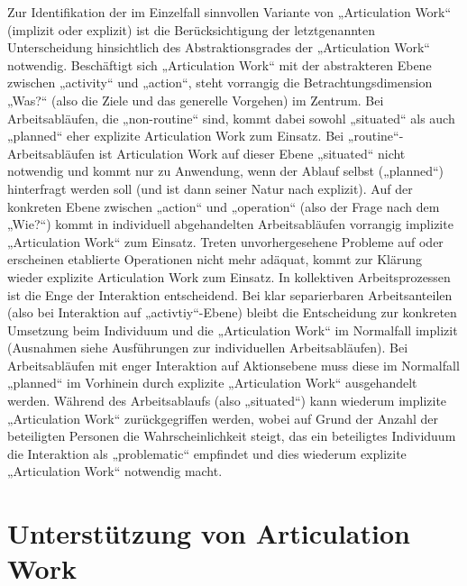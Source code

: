 Zur Identifikation der im Einzelfall sinnvollen Variante von „Articulation Work“ (implizit oder explizit) ist die Berücksichtigung der letztgenannten Unterscheidung hinsichtlich des Abstraktionsgrades der „Articulation Work“ notwendig. Beschäftigt sich „Articulation Work“ mit der abstrakteren Ebene zwischen „activity“ und „action“, steht vorrangig die Betrachtungsdimension „Was?“ (also die Ziele und das generelle Vorgehen) im Zentrum. Bei Arbeitsabläufen, die „non-routine“ sind, kommt dabei sowohl „situated“ als auch „planned“ eher explizite Articulation Work zum Einsatz. Bei „routine“-Arbeitsabläufen ist Articulation Work auf dieser Ebene „situated“ nicht notwendig und kommt nur zu Anwendung, wenn der Ablauf selbst („planned“) hinterfragt werden soll (und ist dann seiner Natur nach explizit). Auf der konkreten Ebene zwischen „action“ und „operation“ (also der Frage nach dem „Wie?“) kommt in individuell abgehandelten Arbeitsabläufen vorrangig implizite „Articulation Work“ zum Einsatz. Treten unvorhergesehene Probleme auf oder erscheinen etablierte Operationen nicht mehr adäquat, kommt zur Klärung wieder explizite Articulation Work zum Einsatz. In kollektiven Arbeitsprozessen ist die Enge der Interaktion entscheidend. Bei klar separierbaren Arbeitsanteilen (also bei Interaktion auf „activtiy“-Ebene) bleibt die Entscheidung zur konkreten Umsetzung beim Individuum und die „Articulation Work“ im Normalfall implizit (Ausnahmen siehe Ausführungen zur individuellen Arbeitsabläufen). Bei Arbeitsabläufen mit enger Interaktion auf Aktionsebene muss diese im Normalfall „planned“ im Vorhinein durch explizite „Articulation Work“ ausgehandelt werden. Während des Arbeitsablaufs (also „situated“) kann wiederum implizite „Articulation Work“ zurückgegriffen werden, wobei auf Grund der Anzahl der beteiligten Personen die Wahrscheinlichkeit steigt, das ein beteiligtes Individuum die Interaktion als „problematic“ empfindet und dies wiederum explizite „Articulation Work“ notwendig macht.
 

\section{Unterstützung von Articulation Work} %
\label{sec:unterstützung_von_articulation_work}


